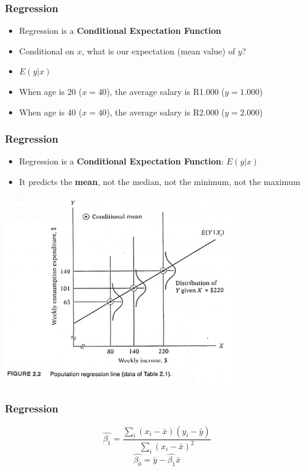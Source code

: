 \documentclass[xcolor=x11names,compress]{beamer}\usepackage[]{graphicx}\usepackage[]{color}
\renewcommand{\(}{\begin{columns}}
\renewcommand{\)}{\end{columns}}
\newcommand{\<}[1]{\begin{column}{#1}}
\renewcommand{\>}{\end{column}}
\begin{document}

\begin{frame}
\frametitle{Regression}
\begin{itemize}
\item Regression is a \textbf{Conditional Expectation Function}
\pause
\item Conditional on $x$, what is our expectation (mean value) of $y$?
\pause
\item $E(y|x)$
\pause
\item When age is 20 ($x=40$), the average salary is R1.000 ($y=1.000$)
\item When age is 40 ($x=40$), the average salary is R2.000 ($y=2.000$)
\end{itemize}
\end{frame}

\begin{frame}
\frametitle{Regression}
\begin{itemize}
\item Regression is a \textbf{Conditional Expectation Function}: $E(y|x)$
\pause
\item It predicts the \textbf{mean}, not the median, not the minimum, not the maximum
\end{itemize}
\includegraphics[width=0.75\textwidth]{CEF.jpg}
\end{frame}

\begin{frame}
\frametitle{Regression}
$$\hat{\beta_1}=\frac{\sum_i (x_i - \bar{x})(y_i - \bar{y})}{\sum_i (x_i - \bar{x})^2}$$
$$\hat{\beta_0}=\bar{y} - \hat{\beta_1} \bar{x}$$
\end{frame}
\end{document}
